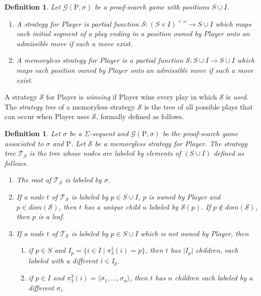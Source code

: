 \documentclass{myifcolog}
\newcommand{\hickp}{\mathrm{P}}
\newtheorem{definition}[theorem]{Definition}
\numberwithin{theorem}{section}
\begin{document}
  \begin{definition}
      Let $\mathscr{G}(\hickp,\sigma)$ be a proof-search game with positions $S \cup I$. 
      \begin{enumerate}
          \item A \emph{strategy} for Player is partial function $\mathcal{S}: (S \times I)^{< \omega} \longrightarrow S \cup I$ which maps each initial segment of a play ending in a position owned by Player onto an admissible move if such a move exist.
          \item A \emph{memoryless strategy} for Player is a partial function $\mathcal{S}: S \cup I \longrightarrow S \cup I$ which maps each position owned by Player onto an admissible move if such a move exist.
      \end{enumerate}
  \end{definition}

A strategy $\mathcal{S}$ for Player is \emph{winning} if Player wins every play in which $\mathcal{S}$ is \emph{used}. The \emph{strategy tree} of a memoryless strategy $\mathcal{S}$ is the tree of all possible plays that can occur when Player uses $\mathcal{S}$, formally defined as follows.

\begin{definition}
    Let $\sigma$ be a $\Sigma$-sequent and $\mathscr{G}(\hickp,\sigma)$ be the proof-search game associated to $\sigma$ and $\hickp$. Let $\mathcal{S}$ be a memoryless strategy for Player. The \emph{strategy tree} $\mathcal{T}_\mathcal{S}$ is the tree whose nodes are labeled by elements of $(S \cup I)$ defined as follows.
    \begin{enumerate}
        \item The root of $\mathcal{T}_\mathcal{S}$ is labeled by $\sigma$.
        \item If a node $t$ of $\mathcal{T}_\mathcal{S}$ is labeled by $p \in S \cup I$, $p$ is owned by Player and $p \in dom(\mathcal{S})$, then $t$ has a unique child $u$ labeled by $\mathcal{S}(p)$. If $p \not \in dom(\mathcal{S})$, then $p$ is a leaf.
        \item If a node $t$ of $\mathcal{T}_\mathcal{S}$ is labeled by $p \in S \cup I$ which is not owned by Player, then 
        \begin{enumerate}
            \item if $p \in S$ and $I_p = \{i \in I \mid \pi_3^1(i)=p\}$, then $t$ has $\lvert{I_p}\rvert$ children, each labeled with a different $i \in I_p$.
            \item if $p \in I$ and $\pi_3^3(i) = \langle \sigma_1, \ldots, \sigma_n\rangle$, then $t$ has $n$ children each labeled by a different $\sigma_i$.
        \end{enumerate}
    \end{enumerate}
\end{definition}
\end{document}
